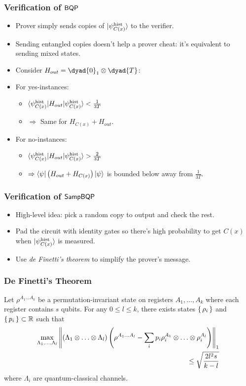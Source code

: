 \documentclass{beamer}
\begin{document}
\begin{frame}
	\frametitle{Verification of $\operatorname{\mathsf{BQP}}$}
	\begin{itemize}[<+->]
		\item Prover simply sends copies of $\ket{\psi_{C(x)}^{\mathrm{hist}}}$ to the verifier.
		\item Sending entangled copies doesn't help a prover cheat: it's equivalent to sending mixed states.
		\item Consider $H_{out}=\dyad{0}_1\otimes\dyad{T}$:
		\item For yes-instances:
			\begin{itemize}[<+->]
				\item $\braket{\psi_{C(x)}^{\mathrm{hist}}|H_{out}|\psi_{C(x)}^{\mathrm{hist}}}<\frac{1}{3T}$
				\item $\Rightarrow$ Same for $H_{C(x)}+H_{out}$.
			\end{itemize}
		\item For no-instances:
			\begin{itemize}[<+->]
				\item $\braket{\psi_{C(x)}^{\mathrm{hist}}|H_{out}|\psi_{C(x)}^{\mathrm{hist}}}>\frac{2}{3T}$
				\item $\Rightarrow\braket{\psi|\left(H_{out}+H_{C(x)}\right)|\psi}$ is bounded below away from $\frac{1}{3T}$.
			\end{itemize}
	\end{itemize}
\end{frame}

\begin{frame}
	\frametitle{Verification of $\operatorname{\mathsf{SampBQP}}$}
	\begin{itemize}[<+->]
		\item High-level idea: pick a random copy to output and check the rest.
		\item Pad the circuit with identity gates so there's high probability to get $C(x)$ when $\ket{\psi_{C(x)}^{\mathrm{hist}}}$ is measured.
		\item Use \emph{de Finetti's theorem} to simplify the prover's message.
	\end{itemize}
\end{frame}

\begin{frame}
	\frametitle{De Finetti's Theorem}
	\begin{theorem}
		\label{deFinetti}
		Let $\rho^{A_1\ldots A_k}$ be a permutation-invariant state on registers $A_1,\ldots,A_k$ where each register contains $s$ qubits.
		For any $0\leq l\leq k$,  there exists states $\set{\rho_i}$ and $\set{p_i}\subset\mathbb{R}$ such that
		\begin{align*}
			\max_{\Lambda_1,\ldots,\Lambda_l}
			\left\lVert (\Lambda_1\otimes\ldots\otimes\Lambda_l)\left(\rho^{A_1\ldots A_l}-\sum_ip_i\rho_i^{A_1}\otimes\ldots\otimes\rho_i^{A_l}\right)\right\rVert_1 \\
			\leq\sqrt{\frac{2l^2s}{k-l}}
		\end{align*}
		where $\Lambda_i$ are quantum-classical channels.
	\end{theorem}
\end{frame}
\end{document}
